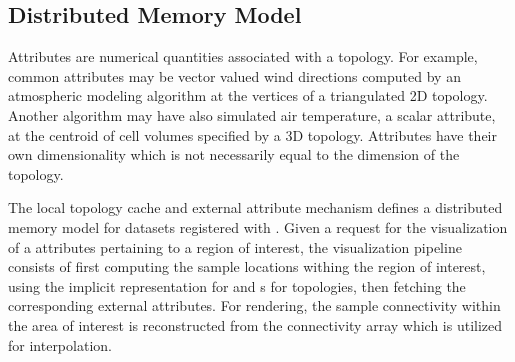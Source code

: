 \subsection{Distributed Memory Model}
Attributes are numerical quantities associated with a topology. For
example, common attributes may be vector valued wind directions computed by an
atmospheric modeling algorithm at the vertices of a triangulated 2D
topology. Another algorithm may have also simulated air temperature,
a scalar attribute, at the centroid of cell volumes specified by a 3D
topology. Attributes have their own dimensionality which is not
necessarily equal to the dimension of the topology.

The local topology cache and external attribute mechanism defines a
distributed memory model for datasets registered with \sciwms{}. Given
a request for the visualization of a attributes pertaining to a region
of interest, the visualization pipeline consists of first computing
the sample locations withing the region of interest, using the
implicit representation for \cgrid{} and \rtree{}s for \ugrid{}
topologies, then fetching the corresponding external attributes. For
rendering, the sample connectivity within the area of interest is
reconstructed from the connectivity array which is utilized for
interpolation.
